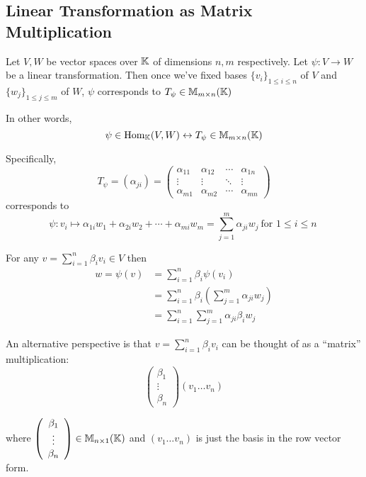 \subsection{Linear Transformation as Matrix Multiplication}
\begin{claim}
    Let \(V, W\) be vector spaces over \(\mathbb{K}\) of dimensions \(n, m\) respectively. Let \(\psi: V \to W\) be a linear transformation. Then once we've fixed bases \(\{v_i\}_{1\leq i \leq n}\) of \(V\) and \(\{w_j\}_{1 \leq j \leq m}\) of \(W\), \(\psi\) corresponds to \(T_\psi \in \mathbb{M}_{m\times n}(\mathbb{K})\)

    In other words, \[
        \psi \in \mathrm{Hom}_{\mathbb{K}}(V, W) \leftrightarrow T_\psi \in \mathbb{M}_{m\times n}(\mathbb{K})
    \]
\end{claim}
Specifically,
\[
    T_\psi = (\alpha_{ji}) = \left(\begin{array}{cccc}
            \alpha_{11} & \alpha_{12} & \cdots & \alpha_{1n} \\
            \vdots      & \vdots      & \ddots & \vdots      \\
            \alpha_{m1} & \alpha_{m2} & \cdots & \alpha_{mn}
        \end{array}\right)
\]
corresponds to \[
    \psi: v_i \mapsto \alpha_{1i}w_1 + \alpha_{2i}w_2 + \cdots + \alpha_{mi}w_m = \sum_{j=1}^{m}\alpha_{ji} w_j \:\text{for \(1 \leq i \leq n\)}\:
\]

For any \(v = \sum_{i = 1}^{n}\beta_i v_i \in V\) then \begin{align*}
    w = \psi(v) & = \sum_{i=1}^{n} \beta_i \psi(v_i)                                 \\
                & = \sum_{i=1}^{n} \beta_i \left(\sum_{j=1}^{m}\alpha_{ji}w_j\right) \\
                & = \sum_{i=1}^{n}\sum_{j=1}^{m}\alpha_{ji} \beta_i w_j
\end{align*}

An alternative perspective is that \(
v = \sum_{i=1}^{n} \beta_i v_i
\) can be thought of as a ``matrix'' multiplication: \[\left(\begin{array}{c}
            \beta_1 \\ \vdots \\ \beta_n
        \end{array}\right) (v_1 \ldots v_n)\]

where \(\left(\begin{array}{c}
        \beta_1 \\ \vdots \\ \beta_n
    \end{array}\right) \in \mathbb{M}_{n \times 1}(\mathbb{K})\) and \((v_1 \ldots v_n)\) is just the basis in the row vector form.

